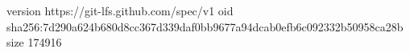 version https://git-lfs.github.com/spec/v1
oid sha256:7d290a624b680d8cc367d339daf0bb9677a94dcab0efb6c092332b50958ca28b
size 174916
